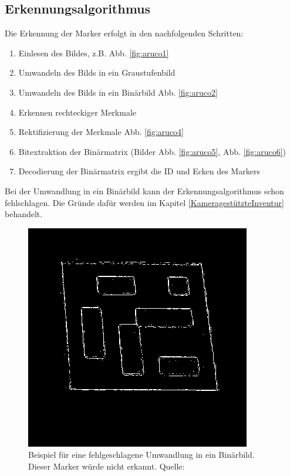 \subsection{Erkennungsalgorithmus}
Die Erkennung der Marker erfolgt in den nachfolgenden Schritten: 

\begin{enumerate}
    \item Einlesen des Bildes, z.B. Abb. \ref{fig:aruco1}
    \item Umwandeln des Bilds in ein Graustufenbild 
    \item Umwandeln des Bilds in ein Binärbild Abb. \ref{fig:aruco2}
    \item Erkennen rechteckiger Merkmale
    \item Rektifizierung der Merkmale Abb. \ref{fig:aruco4}
    \item Bitextraktion der Binärmatrix (Bilder Abb. \ref{fig:aruco5}, Abb. \ref{fig:aruco6})
    \item Decodierung der Binärmatrix ergibt die ID und Ecken des Markers
\end{enumerate}

Bei der Umwandlung in ein Binärbild kann der Erkennungsalgorithmus schon fehlschlagen. 
Die Gründe dafür werden im Kapitel \ref{KameragestützteInventur} behandelt.

\begin{figure}
    \caption{Beispiel für eine fehlgeschlagene Umwandlung in ein Binärbild. Dieser Marker würde nicht erkannt. Quelle: \cite[OpenCV]{OpenCVaruco}}\label{fig:aruco3}
    \includegraphics[width = \textwidth/2]{Bilder/singlemarkersbrokenthresh.png}
    \centering
\end{figure}

